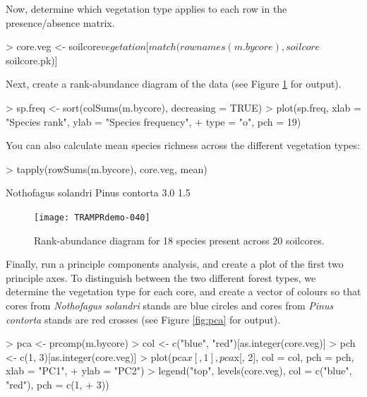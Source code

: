 \documentclass[a4paper]{article}
\begin{document}
Now, determine which vegetation type applies to each row in the
presence/absence matrix.
\begin{Schunk}
\begin{Sinput}
> core.veg <- soilcore$vegetation[match(rownames(m.bycore), soilcore$soilcore.pk)]
\end{Sinput}
\end{Schunk}

Next, create a rank-abundance diagram of the data (see Figure
\ref{fig:rankabundance} for output).

\begin{Schunk}
\begin{Sinput}
> sp.freq <- sort(colSums(m.bycore), decreasing = TRUE)
> plot(sp.freq, xlab = "Species rank", ylab = "Species frequency", 
+     type = "o", pch = 19)
\end{Sinput}
\end{Schunk}

You can also calculate mean species richness across the different
vegetation types:
\begin{Schunk}
\begin{Sinput}
> tapply(rowSums(m.bycore), core.veg, mean)
\end{Sinput}
\begin{Soutput}
Nothofagus solandri      Pinus contorta 
                3.0                 1.5 
\end{Soutput}
\end{Schunk}

\begin{figure}
  \centering
\texttt{[image: TRAMPRdemo-040]}
\caption{Rank-abundance diagram for 18 species
  present across 20 soilcores.
}
\label{fig:rankabundance}
\end{figure}

Finally, run a principle components analysis, and create a plot of the
first two principle axes.  To distinguish between the two different
forest types, we determine the vegetation type for each core, and
create a vector of colours so that cores from \textit{Nothofagus
  solandri} stands are blue circles and cores from \textit{Pinus
  contorta} stands are red crosses (see Figure \ref{fig:pca} for
output).

\begin{Schunk}
\begin{Sinput}
> pca <- prcomp(m.bycore)
> col <- c("blue", "red")[as.integer(core.veg)]
> pch <- c(1, 3)[as.integer(core.veg)]
> plot(pca$x[, 1], pca$x[, 2], col = col, pch = pch, xlab = "PC1", 
+     ylab = "PC2")
> legend("top", levels(core.veg), col = c("blue", "red"), pch = c(1, 
+     3))
\end{Sinput}
\end{Schunk}
\end{document}
